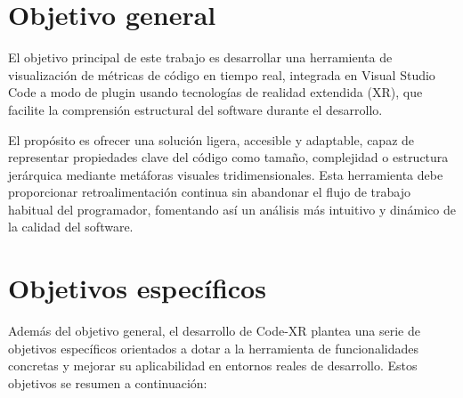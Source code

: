 \documentclass[a4paper, 12pt]{book}
\begin{document}

\section{Objetivo general}
\label{sec:objetivo-general}

El objetivo principal de este trabajo es desarrollar una herramienta de visualización de métricas de código en tiempo real, integrada en Visual Studio Code a modo de plugin usando tecnologías de realidad extendida (XR), que facilite la comprensión estructural del software durante el desarrollo.

El propósito es ofrecer una solución ligera, accesible y adaptable, capaz de representar propiedades clave del código como tamaño, complejidad o estructura jerárquica mediante metáforas visuales tridimensionales. Esta herramienta debe proporcionar retroalimentación continua sin abandonar el flujo de trabajo habitual del programador, fomentando así un análisis más intuitivo y dinámico de la calidad del software.

\section{Objetivos específicos}
\label{sec:objetivos-especificos}

Además del objetivo general, el desarrollo de Code-XR plantea una serie de objetivos específicos orientados a dotar a la herramienta de funcionalidades concretas y mejorar su aplicabilidad en entornos reales de desarrollo. Estos objetivos se resumen a continuación:
\end{document}

